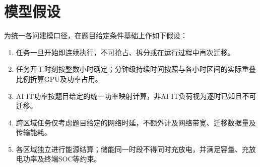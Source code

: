 \section{模型假设}

为统一各问建模口径，在题目给定条件基础上作如下假设：
\begin{enumerate}
	\item 任务一旦开始即连续执行，不可抢占、拆分或在运行过程中再次迁移。
	\item 任务开工时刻按整数小时确定；分钟级持续时间按照与各小时区间的实际重叠比例折算GPU及功率占用。
	\item AI IT功率按题目给定的统一功率映射计算，非AI IT负荷视为逐时已知且不可迁移。
	\item 跨区域任务仅考虑题目给定的网络时延，不额外计及网络带宽、迁移数据量及传输能耗。
	\item 各区域独立进行能源结算；储能同一时段不得同时充放电，并满足容量、充放电功率及终端SOC等约束。
\end{enumerate}
